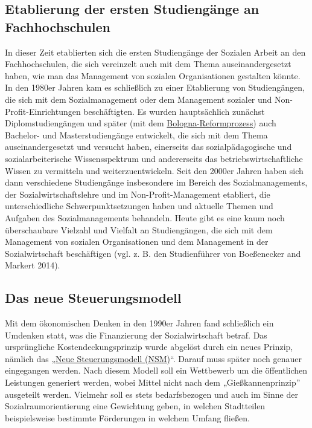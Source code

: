 \documentclass[
  letterpaper,
]{book}
\begin{document}
\subsection{Etablierung der ersten Studiengänge an
Fachhochschulen}\label{fachhochschulen}

In dieser Zeit etablierten sich die ersten Studiengänge der Sozialen
Arbeit an den Fachhochschulen, die sich vereinzelt auch mit dem Thema
auseinandergesetzt haben, wie man das Management von sozialen
Organisationen gestalten könnte. In den 1980er Jahren kam es schließlich
zu einer Etablierung von Studiengängen, die sich mit dem
Sozialmanagement oder dem Management sozialer und
Non-Profit-Einrichtungen beschäftigten. Es wurden hauptsächlich zunächst
Diplomstudiengängen und später (mit dem
\href{https://de.wikipedia.org/wiki/Bologna-Prozess}{Bologna-Reformprozess})
auch Bachelor- und Masterstudiengänge entwickelt, die sich mit dem Thema
auseinandergesetzt und versucht haben, einerseits das sozialpädagogische
und sozialarbeiterische Wissensspektrum und andererseits das
betriebswirtschaftliche Wissen zu vermitteln und weiterzuentwickeln.
Seit den 2000er Jahren haben sich dann verschiedene Studiengänge
insbesondere im Bereich des Sozialmanagements, der
Sozialwirtschaftslehre und im Non-Proﬁt-Management etabliert, die
unterschiedliche Schwerpunktsetzungen haben und aktuelle Themen und
Aufgaben des Sozialmanagements behandeln. Heute gibt es eine kaum noch
überschaubare Vielzahl und Vielfalt an Studiengängen, die sich mit dem
Management von sozialen Organisationen und dem Management in der
Sozialwirtschaft beschäftigen (vgl. z. B. den Studienführer von
Boeßenecker and Markert 2014).

\subsection{Das neue Steuerungsmodell}\label{steuerungsmodell}

Mit dem ökonomischen Denken in den 1990er Jahren fand schließlich ein
Umdenken statt, was die Finanzierung der Sozialwirtschaft betraf. Das
ursprüngliche Kostendeckungsprinzip wurde abgelöst durch ein neues
Prinzip, nämlich das
„\href{https://de.wikipedia.org/wiki/Neues_Steuerungsmodell}{Neue
Steuerungsmodell (NSM)}``. Darauf muss später noch genauer eingegangen
werden. Nach diesem Modell soll ein Wettbewerb um die öffentlichen
Leistungen generiert werden, wobei Mittel nicht nach dem
„Gießkannenprinzip'' ausgeteilt werden. Vielmehr soll es stets
bedarfsbezogen und auch im Sinne der Sozialraumorientierung eine
Gewichtung geben, in welchen Stadtteilen beispielsweise bestimmte
Förderungen in welchem Umfang fließen.
\end{document}
